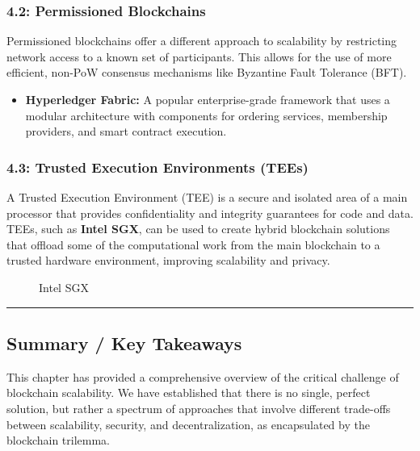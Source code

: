 \subsubsection{4.2: Permissioned
Blockchains}\label{permissioned-blockchains}

Permissioned blockchains offer a different approach to scalability by
restricting network access to a known set of participants. This allows
for the use of more efficient, non-PoW consensus mechanisms like
Byzantine Fault Tolerance (BFT).

\begin{itemize}
\tightlist
\item
  \textbf{Hyperledger Fabric:} A popular enterprise-grade framework that
  uses a modular architecture with components for ordering services,
  membership providers, and smart contract execution.
\end{itemize}

\subsubsection{4.3: Trusted Execution Environments
(TEEs)}\label{trusted-execution-environments-tees}

A Trusted Execution Environment (TEE) is a secure and isolated area of a
main processor that provides confidentiality and integrity guarantees
for code and data. TEEs, such as \textbf{Intel SGX}, can be used to
create hybrid blockchain solutions that offload some of the
computational work from the main blockchain to a trusted hardware
environment, improving scalability and privacy.

\begin{figure}
\centering
\caption{Intel SGX}
\end{figure}

\begin{center}\rule{0.5\linewidth}{0.5pt}\end{center}

\subsection{Summary / Key Takeaways}\label{summary-key-takeaways}

This chapter has provided a comprehensive overview of the critical
challenge of blockchain scalability. We have established that there is
no single, perfect solution, but rather a spectrum of approaches that
involve different trade-offs between scalability, security, and
decentralization, as encapsulated by the blockchain trilemma.

